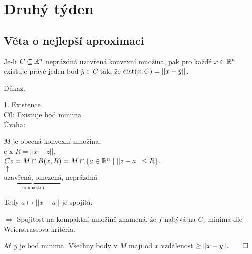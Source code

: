 \section{Druhý týden}

\subsection{Věta o nejlepší aproximaci}
Je-li $C \subseteq \mathbb{R}^n$ neprázdná uzavřená konvexní množina, pak pro každé $x \in \mathbb{R}^n$ existuje právě jeden bod 
$\hat y \in C$ tak, že $\operatorname*{dist} (x; C) = ||x-\hat y||$.

Důkaz.

1. Existence\\
Cíl: Existuje bod minima\\
Úvaha:
\begin{multicols}{2}


\columnbreak
    $M$ je obecná konvexní množina.\\c x
    $R = ||x-z||$,\\
    $Cz = M \cap B (x, R) = M \cap \left\lbrace a \in \mathbb{R}^n \mid ||z-a|| \leq R \right\rbrace$.\\
    $\uparrow$\\
    $\underbrace{\text{uzavřená, omezená}}_\text{kompaktní}$, neprázdná

    Tedy $a \mapsto ||x-a||$ je spojitá.

    $\Rightarrow$ Spojitost na kompaktní množině znamená, že $f$ nabývá na $C_z$ minima dle Weierstrassova kritéria.
\end{multicols}
Ať $y$ je bod minima. Všechny body v $M$ mají od $x$ vzdálenost $\geq ||x-y||. \qed$
\\

